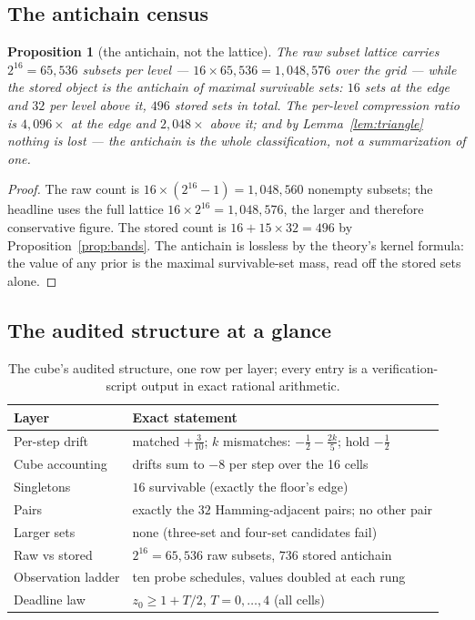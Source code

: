 \documentclass[10pt,twocolumn]{article}
\theoremstyle{plain}
\newtheorem{proposition}[theorem]{Proposition}
\theoremstyle{definition}
\theoremstyle{remark}
\begin{document}
\subsection{The antichain census}\label{census}

\begin{proposition}[the antichain, not the lattice]\label{prop:census}
The raw subset lattice carries \(2^{16} = 65{,}536\) subsets per
level --- \(16 \times 65{,}536 = 1{,}048{,}576\) over the grid ---
while the stored object is the antichain of maximal survivable sets:
\(16\) sets at the edge and \(32\) per level above it, \(496\) stored
sets in total. The per-level compression ratio is \(4{,}096\times\) at
the edge and \(2{,}048\times\) above it; and by
Lemma~\ref{lem:triangle} nothing is lost --- the antichain is the
whole classification, not a summarization of one.
\end{proposition}

\begin{proof}
The raw count is \(16 \times (2^{16} - 1) = 1{,}048{,}560\) nonempty
subsets; the headline uses the full lattice
\(16 \times 2^{16} = 1{,}048{,}576\), the larger and therefore
conservative figure. The stored count is
\(16 + 15 \times 32 = 496\) by Proposition~\ref{prop:bands}. The
antichain is lossless by the theory's kernel formula: the
value of any prior is the maximal survivable-set mass, read off the
stored sets alone.
\end{proof}

\subsection{The audited structure at a glance}\label{glance}

\begin{table}[t]
\centering\footnotesize
\caption{The cube's audited structure, one row per layer; every entry is a
verification-script output in exact rational arithmetic.}
\label{tab:glance}
\begin{tabular}{@{}l p{4.9cm}@{}}
\toprule
Layer & Exact statement \\
\midrule
Per-step drift & matched $+\tfrac3{10}$; $k$ mismatches: $-\tfrac12-\tfrac{2k}{5}$; hold $-\tfrac12$ \\
Cube accounting & drifts sum to $-8$ per step over the 16 cells \\
Singletons & $16$ survivable (exactly the floor's edge) \\
Pairs & exactly the $32$ Hamming-adjacent pairs; no other pair \\
Larger sets & none (three-set and four-set candidates fail) \\
Raw vs stored & $2^{16} = 65{,}536$ raw subsets, $736$ stored antichain \\
Observation ladder & ten probe schedules, values doubled at each rung \\
Deadline law & $z_0 \ge 1 + T/2$, $T = 0, \dots, 4$ (all cells) \\
\bottomrule
\end{tabular}
\end{table}
\end{document}
